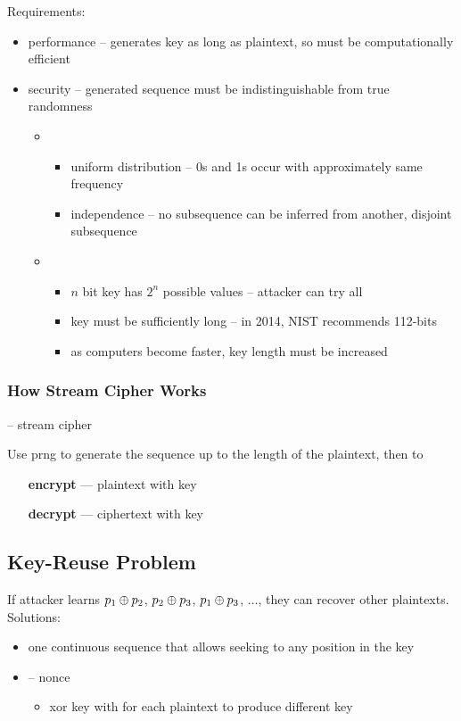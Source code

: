 \documentclass[final]{article}
\begin{document}
Requirements:
\begin{itemize}[nosep]
    \item performance -- generates key as long as plaintext, so must be computationally efficient
    \item security -- generated sequence must be indistinguishable from true randomness
          \begin{itemize}
              \item {}
                    \begin{itemize}[nosep]
                        \item uniform distribution -- 0s and 1s occur with approximately same frequency
                        \item independence -- no subsequence can be inferred from another, disjoint subsequence
                    \end{itemize}
              \item {}
                    \begin{itemize}[nosep]
                        \item $n$ bit key has $2^n$ possible values -- attacker can try all
                        \item key must be sufficiently long -- in 2014, NIST recommends 112-bits
                        \item as computers become faster, key length must be increased
                    \end{itemize}
          \end{itemize}
\end{itemize}

\subsubsection*{How Stream Cipher Works}
 -- \glsdesc*{stream cipher}

Use \acrshort{prng} to generate the sequence up to the length of the plaintext, then to
\begin{itemize}[nosep, align=left, leftmargin=1in]
    \item[\textbf{encrypt} ---]  plaintext with key
    \item[\textbf{decrypt} ---]  ciphertext with key
\end{itemize}
\subsection{Key-Reuse Problem}
If attacker learns $p_1 \oplus p_2$, $p_2 \oplus p_3$, $p_1 \oplus p_3$, $\dots$, they can recover other plaintexts.
Solutions:
\begin{itemize}[nosep]
    \item one continuous sequence that allows seeking to any position in the key
    \item {} -- \glsdesc{nonce}
          \begin{itemize}[nosep]\item xor key with  for each plaintext to produce different key\end{itemize}
\end{itemize}
\end{document}
